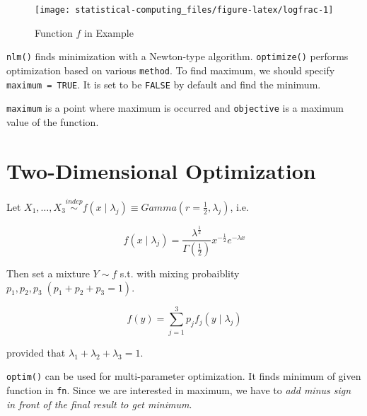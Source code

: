 \documentclass[]{book}
\newenvironment{Shaded}{\begin{snugshade}}{\end{snugshade}}
\newcommand{\CommentTok}[1]{\textcolor[rgb]{0.56,0.35,0.01}{\textit{#1}}}
\newcommand{\DataTypeTok}[1]{\textcolor[rgb]{0.13,0.29,0.53}{#1}}
\newcommand{\DecValTok}[1]{\textcolor[rgb]{0.00,0.00,0.81}{#1}}
\newcommand{\KeywordTok}[1]{\textcolor[rgb]{0.13,0.29,0.53}{\textbf{#1}}}
\newcommand{\NormalTok}[1]{#1}
\newcommand{\OtherTok}[1]{\textcolor[rgb]{0.56,0.35,0.01}{#1}}
\theoremstyle{definition}
\theoremstyle{definition}
\theoremstyle{definition}
\theoremstyle{remark}
\let\BeginKnitrBlock\begin \let\EndKnitrBlock\end
\begin{document}
\begin{figure}[H]

{\centering \texttt{[image: statistical-computing\_files/figure-latex/logfrac-1]} 

}

\caption{Function $f$ in Example}\label{fig:logfrac}
\end{figure}

\texttt{nlm()} finds minimization with a Newton-type algorithm. \texttt{optimize()} performs optimization based on various \texttt{method}. To find maximum, we should specify \texttt{maximum\ =\ TRUE}. It is set to be \texttt{FALSE} by default and find the minimum.

\begin{Shaded}
\end{Shaded}

\texttt{maximum} is a point where maximum is occurred and \texttt{objective} is a maximum value of the function.

\hypertarget{two-dimensional-optimization}{%
\section{Two-Dimensional Optimization}\label{two-dimensional-optimization}}

\BeginKnitrBlock{example}
\protect\hypertarget{exm:mixgam}{}{\label{exm:mixgam} }Let \(X_1, \ldots, X_3 \stackrel{indep}{\sim}f(x \mid \lambda_j) \equiv Gamma(r = \frac{1}{2}, \lambda_j)\), i.e.

\[f(x \mid \lambda_j) = \frac{\lambda^{\frac{1}{2}}}{\Gamma(\frac{1}{2})} x^{- \frac{1}{2}} e^{-\lambda x}\]

Then set a mixture \(Y \sim f\) s.t. with mixing probaiblity \(p_1, p_2, p_3 \;(p_1 + p_2 + p_3 = 1)\).

\[f(y) = \sum_{j = 1}^3 p_j f_j (y \mid \lambda_j)\]

provided that \(\lambda_1 + \lambda_2 + \lambda_3 = 1\).
\EndKnitrBlock{example}

\texttt{optim()} can be used for multi-parameter optimization. It finds minimum of given function in \texttt{fn}. Since we are interested in maximum, we have to \emph{add minus sign in front of the final result to get minimum}.
\end{document}
